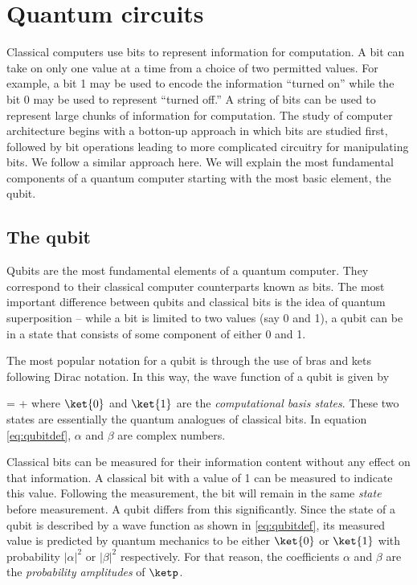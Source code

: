 \chapter{Quantum circuits\label{ch:qcirc}}

Classical computers use bits to represent information for computation. A bit can take on only one value at a time from a choice of two permitted values. For example, a bit 1 may be used to encode the information ``turned on'' while the bit 0 may be used to represent ``turned off.'' A string of bits can be used to represent large chunks of information for computation. The study of computer architecture begins with a botton-up approach in which bits are studied first, followed by bit operations leading to more complicated circuitry for manipulating bits. We follow a similar approach here. We will explain the most fundamental components of a quantum computer starting with the most basic element, the qubit.

\section{The qubit}
Qubits are the most fundamental elements of a quantum computer. They correspond to their classical computer counterparts known as bits. The most important difference between qubits and classical bits is the idea of quantum superposition -- while a bit is limited to two values (say 0 and 1), a qubit can be in a state that consists of some component of either 0 and 1. 

The most popular notation for a qubit is through the use of bras and kets following Dirac notation. In this way, the wave function of a qubit is given by

\beq
\label{eq:qubitdef}
\ketp = \alpha{} + \beta{}
\eeq
where $\ket{0}$ and $\ket{1}$ are the \textit{computational basis states}. These two states are essentially the quantum analogues of classical bits. In equation \eqref{eq:qubitdef}, $\alpha$ and $\beta$ are complex numbers. 

Classical bits can be measured for their information content without any effect on that information. A classical bit with a value of 1 can be measured to indicate this value. Following the measurement, the bit will remain in the same \textit{state} before measurement. A qubit differs from this significantly. Since the state of a qubit is described by a wave function as shown in \eqref{eq:qubitdef}, its measured value is predicted by quantum mechanics to be either $\ket{0}$ or $\ket{1}$ with probability $|\alpha|^2$ or $|\beta|^2$ respectively. For that reason, the coefficients $\alpha$ and $\beta$ are the \textit{probability amplitudes} of $\ketp$.

